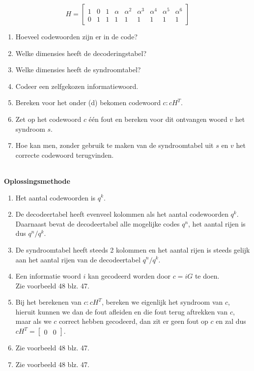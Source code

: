 \documentclass[11pt,a4paper,titlepage]{article}
\begin{document}
\[
H =
\begin{bmatrix}
	1 & 0 & 1 & \alpha	& \alpha^2	& \alpha^3	& \alpha^4 & \alpha^5	& \alpha^6 \\
	0 & 1 & 1 & 1 & 1 & 1 & 1 & 1 & 1
\end{bmatrix}
\]
\begin{enumerate}[label=(\alph*)]
	\item Hoeveel codewoorden zijn er in de code?
	\item Welke dimensies heeft de decoderingstabel?
	\item Welke dimensies heeft de syndroomtabel?
	\item Codeer een zelfgekozen informatiewoord.
	\item Bereken voor het onder (d) bekomen codewoord $c: cH^T$.
	\item Zet op het codewoord $c$ \'e\'en fout en bereken voor dit ontvangen woord $v$ het syndroom $s$.
	\item Hoe kan men, zonder gebruik te maken van de syndroomtabel uit $s$ en $v$ het correcte codewoord terugvinden.
\end{enumerate}
\noindent \\ \textbf{Oplossingsmethode}
	\begin{enumerate}[label=(\alph*)]
	\item Het aantal codewoorden is $q^k$.
	\item De decodeertabel heeft evenveel kolommen als het aantal codewoorden $q^k$. \\ Daarnaast bevat de decodeertabel alle mogelijke codes $q^n$, het aantal rijen is dus $q^n / q^k$.
	\item De syndroomtabel heeft steeds 2 kolommen en het aantal rijen is steeds gelijk aan het aantal rijen van de decodeertabel $q^n / q^k$.
	\item Een informatie woord $i$ kan gecodeerd worden door $c = iG$ te doen.\\ Zie voorbeeld 48 blz. 47.
	\item Bij het berekenen van $c: cH^T$, bereken we eigenlijk het syndroom van $c$, hieruit kunnen we dan de fout afleiden en die fout terug aftrekken van $c$, maar als we $c$ correct hebben gecodeerd, dan zit er geen fout op $c$ en zal dus $cH^T = \begin{bmatrix}0&0\end{bmatrix}$.
	\item Zie voorbeeld 48 blz. 47.
	\item Zie voorbeeld 48 blz. 47.
	\end{enumerate}
\end{document}
